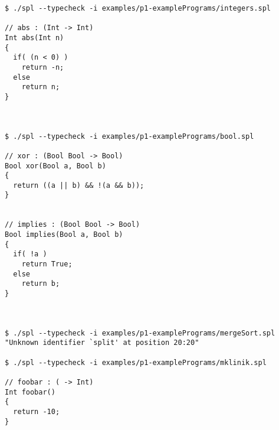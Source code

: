 \documentclass[a4paper]{article}
\begin{document}
\begin{verbatim}
$ ./spl --typecheck -i examples/p1-examplePrograms/integers.spl

// abs : (Int -> Int)
Int abs(Int n)
{
  if( (n < 0) )
    return -n;
  else
    return n;
}



$ ./spl --typecheck -i examples/p1-examplePrograms/bool.spl

// xor : (Bool Bool -> Bool)
Bool xor(Bool a, Bool b)
{
  return ((a || b) && !(a && b));
}


// implies : (Bool Bool -> Bool)
Bool implies(Bool a, Bool b)
{
  if( !a )
    return True;
  else
    return b;
}



$ ./spl --typecheck -i examples/p1-examplePrograms/mergeSort.spl
"Unknown identifier `split' at position 20:20"

$ ./spl --typecheck -i examples/p1-examplePrograms/mklinik.spl

// foobar : ( -> Int)
Int foobar()
{
  return -10;
}
\end{verbatim}



\end{document}
